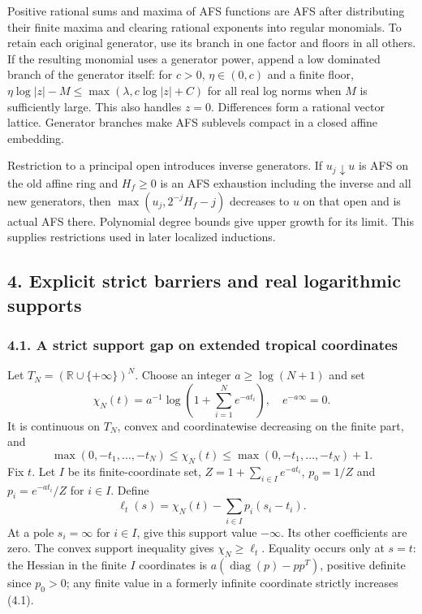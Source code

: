 \documentclass[
  10pt,
]{article}
\begin{document}
Positive rational sums and maxima of AFS functions are AFS after
distributing their finite maxima and clearing rational exponents into
regular monomials. To retain each original generator, use its branch in
one factor and floors in all others. If the resulting monomial uses a
generator power, append a low dominated branch of the generator itself:
for \(c>0\), \(\eta\in(0,c)\) and a finite floor,
\(\eta\log|z|-M\le\max(\lambda,c\log|z|+C)\) for all real log norms when
\(M\) is sufficiently large. This also handles \(z=0\). Differences form
a rational vector lattice. Generator branches make AFS sublevels compact
in a closed affine embedding.

Restriction to a principal open introduces inverse generators. If
\(u_j\downarrow u\) is AFS on the old affine ring and \(H_f\ge0\) is an
AFS exhaustion including the inverse and all new generators, then
\(\max(u_j,2^{-j}H_f-j)\) decreases to \(u\) on that open and is actual
AFS there. Polynomial degree bounds give upper growth for its limit.
This supplies restrictions used in later localized inductions.

\subsection{4. Explicit strict barriers and real logarithmic
supports}\label{explicit-strict-barriers-and-real-logarithmic-supports}

\subsubsection{4.1. A strict support gap on extended tropical
coordinates}\label{a-strict-support-gap-on-extended-tropical-coordinates}

Let \(T_N=(\mathbb R\cup\{+\infty\})^N\). Choose an integer
\(a\ge\log(N+1)\) and set
\[\chi_N(t)=a^{-1}\log\left(1+\sum_{i=1}^N e^{-at_i}\right),\quad e^{-a\infty}=0. \tag{4.1}\]
It is continuous on \(T_N\), convex and coordinatewise decreasing on the
finite part, and \[\max(0,-t_1,\ldots,-t_N)\le\chi_N(t)
 \le\max(0,-t_1,\ldots,-t_N)+1. \tag{4.2}\] Fix \(t\). Let \(I\) be its
finite-coordinate set, \(Z=1+\sum_{i\in I}e^{-at_i}\), \(p_0=1/Z\) and
\(p_i=e^{-at_i}/Z\) for \(i\in I\). Define
\[\ell_t(s)=\chi_N(t)-\sum_{i\in I}p_i(s_i-t_i). \tag{4.3}\] At a pole
\(s_i=\infty\) for \(i\in I\), give this support value \(-\infty\). Its
other coefficients are zero. The convex support inequality gives
\(\chi_N\ge\ell_t\). Equality occurs only at \(s=t\): the Hessian in the
finite \(I\) coordinates is \(a(\operatorname{diag}(p)-pp^T)\), positive
definite since \(p_0>0\); any finite value in a formerly infinite
coordinate strictly increases (4.1).
\end{document}
